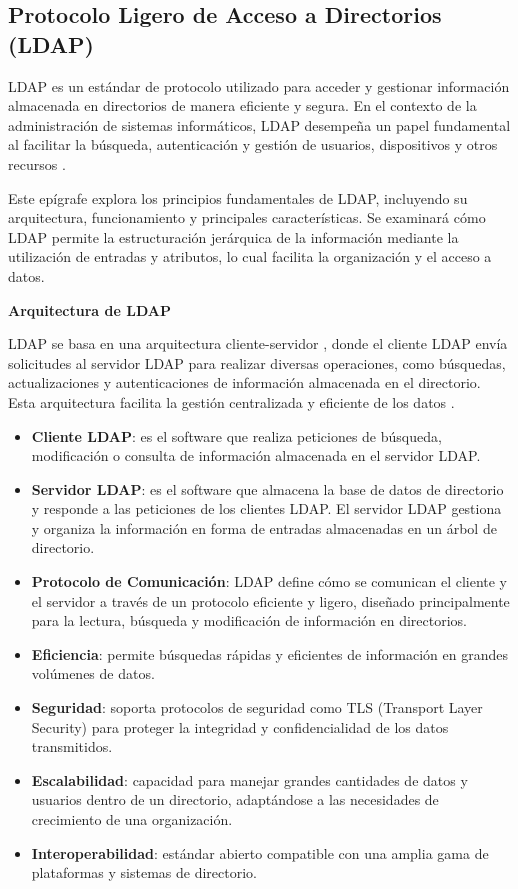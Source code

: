 \subsection{Protocolo Ligero de Acceso a Directorios (LDAP)}

LDAP es un estándar de protocolo utilizado para acceder y gestionar información almacenada en directorios de manera eficiente y segura. En el contexto de la administración de sistemas informáticos, LDAP desempeña un papel fundamental al facilitar la búsqueda, autenticación y gestión de usuarios, dispositivos y otros recursos \autocite{sermersheim_lightweight_2006,carter_ldap_2003,howes_ldap_1997}.

Este epígrafe explora los principios fundamentales de LDAP, incluyendo su arquitectura, funcionamiento y principales características. Se examinará cómo LDAP permite la estructuración jerárquica de la información mediante la utilización de entradas y atributos, lo cual facilita la organización y el acceso a datos.

\textbf{Arquitectura de LDAP}

LDAP se basa en una arquitectura cliente-servidor \autocite{voglmaier_abcs_2003}, donde el cliente LDAP envía solicitudes al servidor LDAP para realizar diversas operaciones, como búsquedas, actualizaciones y autenticaciones de información almacenada en el directorio. Esta arquitectura facilita la gestión centralizada y eficiente de los datos \autocite{harrison_lightweight_2006,sermersheim_lightweight_2006,carter_ldap_2003}.

\begin{itemize}
    \item \textbf{Cliente LDAP}: es el software que realiza peticiones de búsqueda, modificación o consulta de información almacenada en el servidor LDAP.
    \item \textbf{Servidor LDAP}: es el software que almacena la base de datos de directorio y responde a las peticiones de los clientes LDAP. El servidor LDAP gestiona y organiza la información en forma de entradas almacenadas en un árbol de directorio.
    \item \textbf{Protocolo de Comunicación}: LDAP define cómo se comunican el cliente y el servidor a través de un protocolo eficiente y ligero, diseñado principalmente para la lectura, búsqueda y modificación de información en directorios.
    \item \textbf{Eficiencia}: permite búsquedas rápidas y eficientes de información en grandes volúmenes de datos.
    \item \textbf{Seguridad}: soporta protocolos de seguridad como TLS (Transport Layer Security) para proteger la integridad y confidencialidad de los datos transmitidos.
    \item \textbf{Escalabilidad}: capacidad para manejar grandes cantidades de datos y usuarios dentro de un directorio, adaptándose a las necesidades de crecimiento de una organización.
    \item \textbf{Interoperabilidad}: estándar abierto compatible con una amplia gama de plataformas y sistemas de directorio.
\end{itemize}


